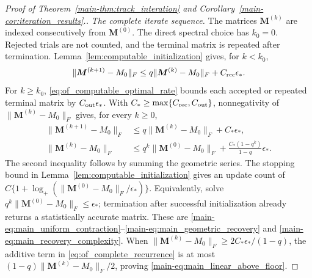 \documentclass[numsec,webpdf,modern,large,namedate]{oup-authoring-template}
\theoremstyle{plain}
\theoremstyle{remark}
\newcommand{\M}{\bm{M}}
\newif\ifmarkchanges
\newenvironment{revision}{\begingroup\ifmarkchanges\color{red}\fi}{\endgroup}
\begin{document}
\begin{revision}
\begin{proof}[Proof of Theorem~\ref{main-thm:track_interation} and Corollary~\ref{main-cor:iteration_results}.]
\textit{The complete iterate sequence.} The matrices $\M^{(k)}$ are indexed
consecutively from $\M^{(0)}$. The direct spectral choice has $k_0=0$.
Rejected trials are not counted, and the terminal matrix is repeated after
termination. Lemma~\ref{lem:computable_initialization} gives, for $k<k_0$,
\[
 \|\M^{(k+1)}-M_0\|_F
 \le q\|\M^{(k)}-M_0\|_F+C_{\rm rec}\epsilon_*.
\]
For $k\ge k_0$, \eqref{eq:of_computable_optimal_rate} bounds each accepted
or repeated terminal matrix by $C_{\rm out}\epsilon_*$. With
$C_*\ge\max\{C_{\rm rec},C_{\rm out}\}$, nonnegativity of
$\|\M^{(k)}-M_0\|_F$ gives, for every $k\ge0$,
\begin{align}
 \|\M^{(k+1)}-M_0\|_F
 &\le q\|\M^{(k)}-M_0\|_F+C_*\epsilon_*,\label{eq:of_complete_recurrence}\\
 \|\M^{(k)}-M_0\|_F
 &\le q^k\|\M^{(0)}-M_0\|_F+
       \frac{C_*(1-q^k)}{1-q}\epsilon_*.
 \label{eq:of_complete_geometric}
\end{align}
The second inequality follows by summing the geometric series. The stopping
bound in Lemma~\ref{lem:computable_initialization} gives an update count of
$C\{1+\log_+(\|\M^{(0)}-M_0\|_F/\epsilon_*)\}$. Equivalently, solve
$q^k\|\M^{(0)}-M_0\|_F\le\epsilon_*$; termination after successful
initialization already returns a statistically accurate matrix.
These are \eqref{main-eq:main_uniform_contraction}--\eqref{main-eq:main_geometric_recovery}
and \eqref{main-eq:main_recovery_complexity}. When
$\|\M^{(k)}-M_0\|_F\ge2C_*\epsilon_* /(1-q)$, the additive term in
\eqref{eq:of_complete_recurrence} is at most
$(1-q)\|\M^{(k)}-M_0\|_F/2$, proving \eqref{main-eq:main_linear_above_floor}.

\end{proof}


\end{revision}
\end{document}
